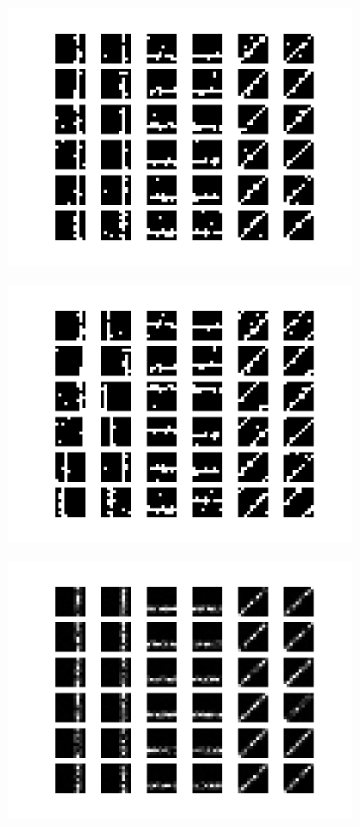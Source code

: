 \begin{figure}[h!]
	\centering
	\begin{subfigure}[t]{.49\textwidth}
  		\centering
  		\includegraphics[width=.85\linewidth]{imgs/stripes31.png}
  		\caption{}
  		\label{fig:stripes1}
	\end{subfigure}%
	\begin{subfigure}[t]{.49\textwidth}
  		\centering
  		\includegraphics[width=.85\linewidth]{imgs/stripes41.png}
  		\caption{}
  		\label{fig:stripes2}
	\end{subfigure}
	\begin{subfigure}[t]{.49\textwidth}
  		\centering
  		\includegraphics[width=.85\linewidth]{imgs/stripes21.png}

\end{subfigure}
\end{figure}
